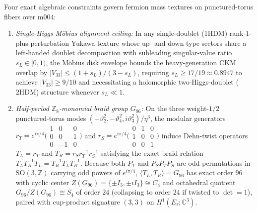 \documentclass[aps,prd,twocolumn,nofootinbib,floatfix]{revtex4-2}
\begin{document}
Four exact algebraic constraints govern fermion mass textures on punctured-torus fibers over $\mathrm{m004}$:
\begin{enumerate}
    \item \emph{Single-Higgs M\"obius alignment ceiling:} In any single-doublet ($1\mathrm{HDM}$) rank-$1$-plus-perturbation Yukawa texture whose up- and down-type sectors share a left-handed doublet decomposition with subleading singular-value ratio $s_L \in [0,1)$, the M\"obius disk envelope bounds the heavy-generation CKM overlap by $|V_{33}| \le (1 + s_L)/(3 - s_L)$, requiring $s_L \ge 17/19 \approx 0.8947$ to achieve $|V_{33}| \ge 9/10$ and necessitating a holomorphic two-Higgs-doublet ($2\mathrm{HDM}$) structure whenever $s_L \ll 1$.
    \item \emph{Half-period $\mathbb{Z}_8$-monomial braid group $G_{96}$:} On the three weight-$1/2$ punctured-torus modes $(-\vartheta_2^2, -\vartheta_4^2, i\vartheta_3^2)/\eta^3$, the modular generators $r_T = e^{i\pi/4}\bigl(\begin{smallmatrix}1&0&0\\0&0&1\\0&-1&0\end{smallmatrix}\bigr)$ and $r_S = e^{i\pi/4}\bigl(\begin{smallmatrix}0&1&0\\1&0&0\\0&0&1\end{smallmatrix}\bigr)$ induce Dehn-twist operators $T_L = r_T$ and $T_R = r_S r_T^{-1} r_S^{-1}$ satisfying the exact braid relation $T_L T_R^{-1} T_L = T_R^{-1} T_L T_R^{-1}$. Because both $P_T$ and $P_S P_T P_S$ are odd permutations in $\mathrm{SO}(3,\mathbb{Z})$ carrying odd powers of $e^{i\pi/4}$, $\langle T_L, T_R \rangle = G_{96}$ has exact order $96$ with cyclic center $Z(G_{96}) = \{\pm I_3, \pm i I_3\} \cong C_4$ and octahedral quotient $G_{96}/Z(G_{96}) \cong S_4$ of order $24$ (collapsing to order $24$ if twisted to $\det = 1$), paired with cup-product signature $(3,3)$ on $H^1(E_\tau; \mathbb{C}^3)$.

\end{enumerate}
\end{document}
